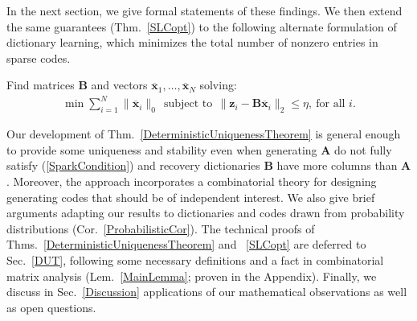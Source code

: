 In the next section, we give formal statements of these findings.  We then extend the same guarantees (Thm.~\ref{SLCopt}) to the following alternate formulation of dictionary learning, which minimizes the total number of nonzero entries in sparse codes.

\begin{problem}\label{OptimizationProblem}
Find matrices $\mathbf{B}$ and vectors \mbox{$\mathbf{\overline x}_1, \ldots, \mathbf{\overline x}_N$} solving:
\begin{align}\label{minsum}
\min \sum_{i = 1}^N \|\mathbf{\overline x}_{i}\|_0 \ \
\text{subject to} \ \ \|\mathbf{z}_i - \mathbf{B}\mathbf{\overline x}_i\|_2 \leq \eta, \ \text{for all $i$}.
\end{align}
\end{problem}

Our development of Thm.~\ref{DeterministicUniquenessTheorem} is general enough to provide some uniqueness and stability even when generating $\mathbf{A}$ do not fully satisfy (\ref{SparkCondition}) and recovery dictionaries $\mathbf{B}$ have more columns than $\mathbf{A}$.  Moreover, the approach incorporates a combinatorial theory for designing generating codes that should be of independent interest. We also give brief arguments adapting our results to dictionaries and codes drawn from probability distributions (Cor.~\ref{ProbabilisticCor}). The technical proofs of Thms.~\ref{DeterministicUniquenessTheorem} and ~\ref{SLCopt} are deferred to Sec.~\ref{DUT}, following some necessary definitions and a fact in combinatorial matrix analysis (Lem.~\ref{MainLemma}; proven in the Appendix). Finally, we discuss in Sec.~\ref{Discussion} applications of our mathematical observations as well as open questions. 
